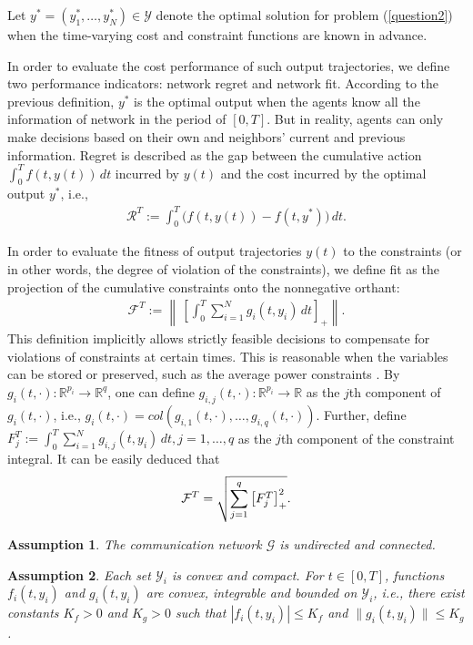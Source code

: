 \documentclass[letterpaper, 10 pt, conference]{ieeeconf}  %
\newtheorem{assumption}{ {Assumption}}
\begin{document}
Let $y^*=(y_1^*,\dots,y_N^*)\in \mathcal{Y}$ denote the optimal solution for problem (\ref{question2}) when the time-varying cost and constraint functions are known in advance.  

In order to evaluate the cost performance of such output trajectories, we define two performance indicators: network regret and network fit. According to the previous definition, $y^*$ is the optimal output when the agents know all the information of network in the period of $[0, T]$. But in reality, agents can only make decisions based on their own and neighbors' current and previous information. Regret is described as the gap between the cumulative action $\int_{0}^{T} f(t,y(t))\,dt$ incurred by $y(t)$ and the cost incurred by the optimal output $y^*$, i.e.,
\begin{align}
	\mathcal{R}^T:=\int_{0}^{T} \Big(f(t,y(t))-f(t,y^*)\Big)\,dt\label{regert}.
\end{align}

In order to evaluate the fitness of output trajectories $y(t)$ to the constraints (or in other words, the degree of violation of the constraints), we define fit as the projection of the cumulative constraints onto the nonnegative orthant:
\begin{align}
	\mathcal{F}^T:=\left\|\,\left[\int_{0}^{T} \sum_{i=1}^{N}g_{i}(t, y_i) \,dt\right]_+\right\|.\label{fit}
\end{align}
This definition implicitly allows strictly feasible decisions to compensate for violations of constraints at certain times. This is reasonable when the variables can be stored or preserved, such as the average power constraints \cite{pater2017}.
By $g_i(t,\cdot): \mathbb{R}^{p_i}\to \mathbb{R}^{q}$, one can define $g_{i,j}(t,\cdot): \mathbb{R}^{p_i}\to \mathbb{R}$ as the $j$th component of $g_i(t,\cdot)$, i.e., $g_i(t,\cdot) = col\left(g_{i,1}(t,\cdot), \dots, g_{i,q}(t,\cdot)\right)$. Further, define $F_j^T:=\int_{0}^{T} \sum_{i=1}^{N}g_{i,j}(t, y_i)\,dt, j=1,\dots,q$ as the $j$th component of the constraint integral. It can be easily deduced that
\begin{align}
	\mathcal{F}^T=\sqrt{\sum_{j=1}^q\left[F_j^T\right]_+^2}.\notag
\end{align}
\begin{assumption} \label{asp1}
	The communication network $\mathcal{G}$ is undirected and connected.	
\end{assumption}

\begin{assumption} \label{asp2}
	Each set $\mathcal{Y}_i$ is convex and compact. For $t\in [0,T]$, functions $f_i(t,y_i)$ and $g_i(t,y_i)$ are convex, integrable and bounded on $\mathcal{Y}_i$, i.e., there exist constants $K_f>0$ and $K_g>0$ such that $|f_i(t,y_i)|\le K_f$ and $\|g_i(t,y_i)\|\le K_g$.
\end{assumption}
\end{document}
